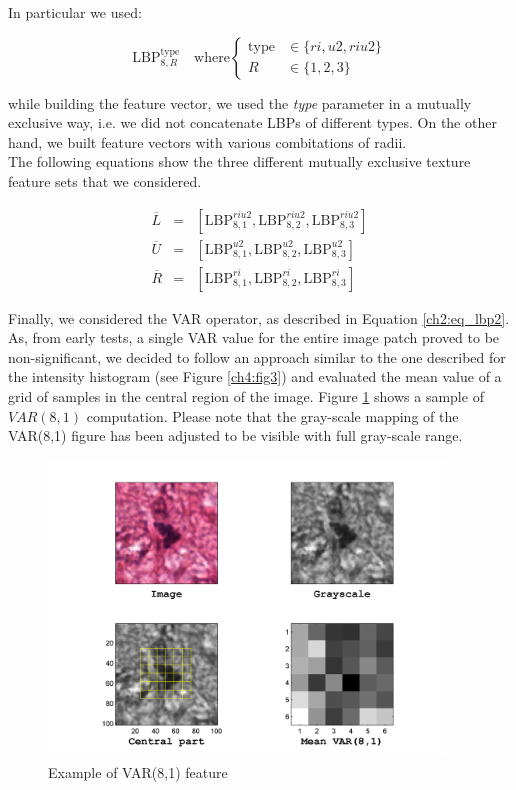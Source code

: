 In particular we used:

\begin{equation}
 \text{LBP}_{8,R}^{\text{type}} \quad \textrm{where} \begin{cases}
    \text{type}  & \in \{ri, u2, riu2\}\\
    R  & \in \{1,2,3\}
  \end{cases}
\end{equation}

while building the feature vector, we used the \textit{type} parameter in a mutually exclusive way, i.e. we did not concatenate \Glspl{LBP} of different types. On the other hand, we
built feature vectors with various combitations of radii.\\
The following equations show the three different mutually exclusive texture feature sets that we considered.

\begin{eqnarray}
\label{ch4:tftypes}
 \overline{L} & = & \left[ \text{LBP}_{8,1}^{riu2}, \text{LBP}_{8,2}^{riu2}, \text{LBP}_{8,3}^{riu2} \right] \\
 \overline{U} & = & \left[ \text{LBP}_{8,1}^{u2}, \text{LBP}_{8,2}^{u2}, \text{LBP}_{8,3}^{u2} \right] \\
 \overline{R} & = & \left[ \text{LBP}_{8,1}^{ri}, \text{LBP}_{8,2}^{ri}, \text{LBP}_{8,3}^{ri} \right]
\end{eqnarray}

Finally, we considered the \Gls{VAR} operator, as described in Equation \ref{ch2:eq_lbp2}. As, from early tests, a single \Gls{VAR} value for the entire image patch proved to be non-significant, we
decided to follow an approach similar to the one described for the intensity histogram (see Figure \ref{ch4:fig3}) and evaluated the mean value of a grid of samples in the central
region of the image. Figure \ref{ch4:fig4} shows a sample of $VAR(8,1)$ computation. Please note that the gray-scale mapping of the VAR(8,1) figure has been adjusted to be visible with full gray-scale range.

\begin{figure}[!hbt]
  \centering
    \includegraphics[width=0.94\textwidth]{./images/GS_VAR.png}
  \caption[Example of VAR(8,1) feature]{Example of VAR(8,1) feature}
  \label{ch4:fig4}
\end{figure}

